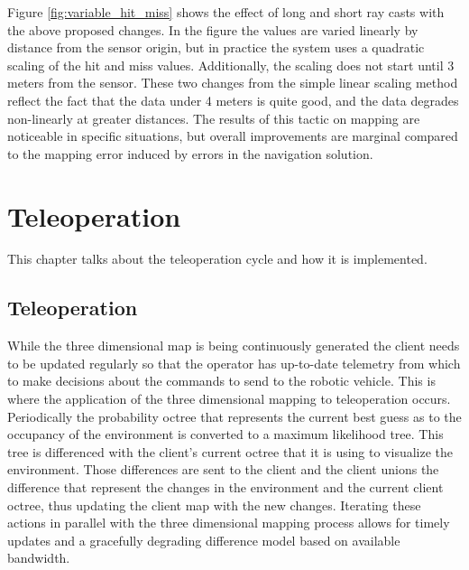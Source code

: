 \documentclass[12pt]{report}
\begin{document}
Figure \ref{fig:variable_hit_miss} shows the effect of long and short ray casts with the above proposed changes.  In the figure the values are varied linearly by distance from the sensor origin, but in practice the system uses a quadratic scaling of the hit and miss values.  Additionally, the scaling does not start until 3 meters from the sensor.  These two changes from the simple linear scaling method reflect the fact that the data under 4 meters is quite good, and the data degrades non-linearly at greater distances.  The results of this tactic on mapping are noticeable in specific situations, but overall improvements are marginal compared to the mapping error induced by errors in the navigation solution.


\chapter{Teleoperation}\label{chap:teleoperation}
This chapter talks about the teleoperation cycle and how it is implemented.

\section{Teleoperation}
While the three dimensional map is being continuously generated the client needs to be updated regularly so that the operator has up-to-date telemetry from which to make decisions about the commands to send to the robotic vehicle. This is where the application of the three dimensional mapping to teleoperation occurs. Periodically the probability octree that represents the current best guess as to the occupancy of the environment is converted to a maximum likelihood tree. This tree is differenced with the client's current octree that it is using to visualize the environment. Those differences are sent to the client and the client unions the difference that represent the changes in the environment and the current client octree, thus updating the client map with the new changes. Iterating these actions in parallel with the three dimensional mapping process allows for timely updates and a gracefully degrading difference model based on available bandwidth.
\end{document}
